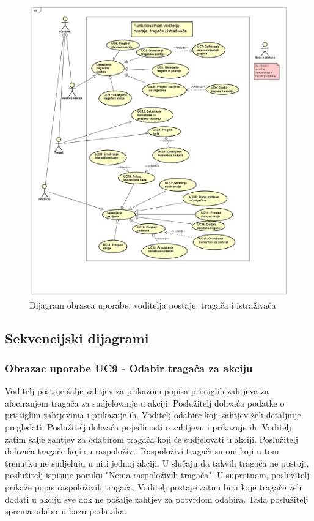 					\begin{figure}[H]
						\includegraphics[scale=0.4]{dijagrami/voditelj-tragac-istrazivac-dijagram.PNG} 
						\centering
						\caption{Dijagram obrasca uporabe, voditelja postaje, tragača i istraživača}
						\label{fig:promjene}
					\end{figure}
					
			\eject				
				
			\subsection{Sekvencijski dijagrami}
			
				\subsubsection{Obrazac uporabe UC9 - Odabir tragača za akciju}
				Voditelj postaje šalje zahtjev za prikazom popisa pristiglih zahtjeva za alociranjem tragača za sudjelovanje u akciji. Poslužitelj dohvaća podatke o pristiglim zahtjevima i prikazuje ih. Voditelj odabire koji zahtjev želi detaljnije pregledati. Poslužitelj dohvaća pojedinosti o zahtjevu i prikazuje ih. Voditelj zatim šalje zahtjev za odabirom tragača koji će sudjelovati u akciji. Poslužitelj dohvaća tragače koji su raspoloživi. Raspoloživi tragači su oni koji u tom trenutku ne sudjeluju u niti jednoj akciji. U slučaju da takvih tragača ne postoji, poslužitelj ispisuje poruku "Nema raspoloživih tragača". U suprotnom, poslužitelj prikaže popis raspoloživih tragača.  Voditelj postaje zatim bira koje tragače želi dodati u akciju sve dok ne pošalje zahtjev za potvrdom odabira. Tada poslužitelj sprema odabir u bazu podataka.
				
